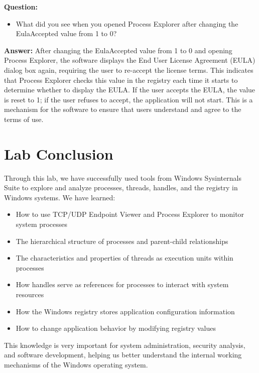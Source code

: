 \documentclass[12pt,a4paper]{article}
\begin{document}
\textbf{Question:}
\begin{itemize}
    \item What did you see when you opened Process Explorer after changing the EulaAccepted value from 1 to 0?
\end{itemize}

\textbf{Answer:}
After changing the EulaAccepted value from 1 to 0 and opening Process Explorer, the software displays the End User License Agreement (EULA) dialog box again, requiring the user to re-accept the license terms. This indicates that Process Explorer checks this value in the registry each time it starts to determine whether to display the EULA. If the user accepts the EULA, the value is reset to 1; if the user refuses to accept, the application will not start. This is a mechanism for the software to ensure that users understand and agree to the terms of use.

\section{Lab Conclusion}

Through this lab, we have successfully used tools from Windows Sysinternals Suite to explore and analyze processes, threads, handles, and the registry in Windows systems. We have learned:

\begin{itemize}
    \item How to use TCP/UDP Endpoint Viewer and Process Explorer to monitor system processes
    \item The hierarchical structure of processes and parent-child relationships
    \item The characteristics and properties of threads as execution units within processes
    \item How handles serve as references for processes to interact with system resources
    \item How the Windows registry stores application configuration information
    \item How to change application behavior by modifying registry values
\end{itemize}

This knowledge is very important for system administration, security analysis, and software development, helping us better understand the internal working mechanisms of the Windows operating system.
\end{document}
